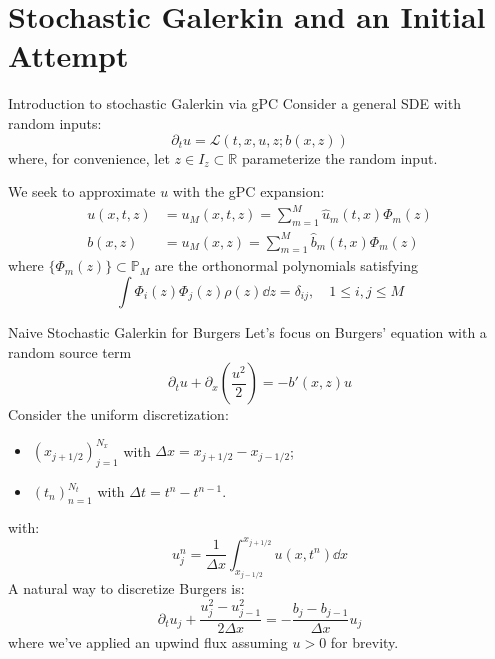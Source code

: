 \documentclass[
    pdf,
    11pt,
    xcolor={svgnames},
  ]{beamer}
\begin{document}
\section{Stochastic Galerkin and an Initial Attempt}

\begin{frame}{Introduction to stochastic Galerkin via gPC}
    Consider a general SDE with random inputs:
    \begin{equation} \label{eq:SDE}
        \partial_t u = \mathcal{L}(t,x,u,z;b(x,z))
    \end{equation}
    where, for convenience, let $z \in I_z \subset \mathbb{R}$ parameterize the random input.
    
    \pause
    
    We seek to approximate $u$ with the gPC expansion:
    \begin{align*}
        u(x,t,z) &= u_M(x,t,z) = \sum_{m=1}^M \hat{u}_m(t,x) \Phi_m(z) \\
        b(x,z) &= u_M(x,z) = \sum_{m=1}^M \hat{b}_m(t,x) \Phi_m(z) 
    \end{align*}
    where $\{\Phi_m(z)\} \subset \mathbb{P}_M$ are the orthonormal polynomials satisfying
    \[
    \int \Phi_i(z) \Phi_j(z) \rho(z) \dd{z} = \delta_{ij},
    \quad 1 \leq i,j \leq M
    \]
\end{frame}

\begin{frame}{Naive Stochastic Galerkin for Burgers}
    Let's focus on Burgers' equation with a random source term
    \begin{equation}
        \partial_t u + \partial_x \left( \frac{u^2}{2} \right) = -b'(x,z) u
    \end{equation}
    \pause
    Consider the uniform discretization:
    \begin{itemize}
        \item $(x_{j+1/2})_{j=1}^{N_x}$ with $\Delta x = x_{j+1/2}-x_{j-1/2}$;
        \item $(t_n)_{n=1}^{N_t}$ with $\Delta t = t^n - t^{n-1}$.
    \end{itemize}
    with:
    \begin{equation*}
        u_j^n = \frac{1}{\Delta x} \int_{x_{j-1/2}}^{x_{j+1/2}} u(x,t^n) \dd{x}
    \end{equation*}
    \pause
    A natural way to discretize Burgers is:
    \begin{equation} \label{eq:burgers_inteface}
        \partial_t u_j + \frac{u_j^2 - u_{j-1}^2}{2 \Delta x} = -\frac{b_j - b_{j-1}}{\Delta x} u_j
    \end{equation}
    where we've applied an upwind flux assuming $u > 0$ for brevity.
\end{frame}
\end{document}
